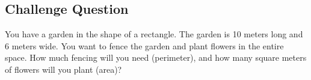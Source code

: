 \subsection{Challenge Question}
You have a garden in the shape of a rectangle. The garden is 10 meters long and 6 meters wide. You want to fence the garden and plant flowers in the entire space. How much fencing will you need (perimeter), and how many square meters of flowers will you plant (area)?


